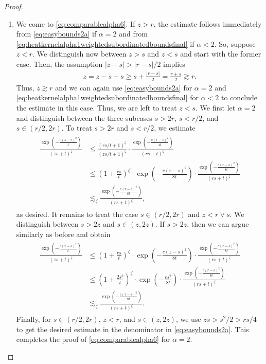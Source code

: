 \documentclass[12pt,reqno,a4paper]{amsart}
\theoremstyle{definition}
\theoremstyle{remark}
\numberwithin{equation}{section}
\newcommand{\1}{\mathbbm{1}}
\newcommand{\one}{\mathbf{1}}
\begin{document}
\begin{proof}
\begin{enumerate}
    \smallskip
  \item We come to \eqref{eq:comparablealpha6}.
    If $z>r$, the estimate follows immediately from \eqref{eq:easybounds2a} if $\alpha=2$ and from \eqref{eq:heatkernelalpha1weightedsubordinatedboundsfinal} if $\alpha<2$. So, suppose $z<r$. We distinguish now between $z>s$ and $z<s$ and start with the former case. Then, the assumption $|z-s|>|r-s|/2$ implies
    \begin{align}
      z = z-s+s\geq s+\frac{|r-s|}{2}
      = \frac{r+s}{2}
      \gtrsim r.
    \end{align}
    Thus, $z\gtrsim r$ and we can again use \eqref{eq:easybounds2a} for $\alpha=2$ and \eqref{eq:heatkernelalpha1weightedsubordinatedboundsfinal} for $\alpha<2$ to conclude the estimate in this case.
    Thus, we are left to treat $z<s$.
    We first let $\alpha=2$ and distinguish between the three subcases $s>2r$, $s<r/2$, and $s\in(r/2,2r)$. To treat $s>2r$ and $s<r/2$, we estimate
    \begin{align}
      \begin{split}
        \frac{\exp\left(-\frac{c(z-s)^2}{t}\right)}{(zs+t)^\zeta}
        & \leq \frac{(rs/t+1)^\zeta}{(zs/t+1)^\zeta} \cdot \frac{\exp\left(-\frac{c(r-s)^2}{4t}\right)}{(rs+t)^\zeta} \\
        & \leq \left(1+\frac{rs}{t}\right)^\zeta \cdot \exp\left(-\frac{c(r-s)^2}{8t}\right) \cdot \frac{\exp\left(-\frac{c(r-s)^2}{8t}\right)}{(rs+t)^\zeta} \\
        & \lesssim_\zeta \frac{\exp\left(-\frac{c(r-s)^2}{8t}\right)}{(rs+t)^\zeta},
      \end{split}
    \end{align}
    as desired. It remains to treat the case $s\in(r/2,2r)$ and $z<r\vee s$. We distinguish between $s>2z$ and $s\in(z,2z)$. If $s>2z$, then we can argue similarly as before and obtain
    \begin{align}
      \begin{split}
        \frac{\exp\left(-\frac{c(z-s)^2}{t}\right)}{(zs+t)^\zeta}
        & \leq \left(1+\frac{rs}{t}\right)^\zeta \cdot \exp\left(-\frac{c(z-s)^2}{8t}\right) \cdot \frac{\exp\left(-\frac{c(r-s)^2}{8t}\right)}{(rs+t)^\zeta} \\
        & \leq \left(1+\frac{2s^2}{t}\right)^\zeta \cdot \exp\left(-\frac{cs^2}{8t}\right) \cdot \frac{\exp\left(-\frac{c(r-s)^2}{8t}\right)}{(rs+t)^\zeta} \\
        & \lesssim_\zeta \frac{\exp\left(-\frac{c(r-s)^2}{8t}\right)}{(rs+t)^\zeta}.
      \end{split}
    \end{align}
    Finally, for $s\in(r/2,2r)$, $z<r$, and $s\in(z,2z)$, we use $zs>s^2/2>rs/4$ to get the desired estimate in the denominator in \eqref{eq:easybounds2a}. This completes the proof of \eqref{eq:comparablealpha6} for $\alpha=2$.
    

\end{enumerate}
\end{proof}
\end{document}
